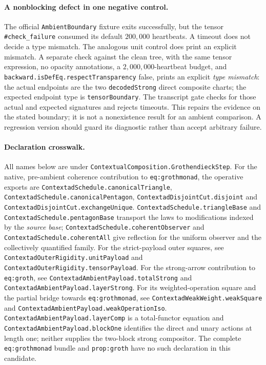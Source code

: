 \documentclass[11pt]{article}
\begin{document}
\paragraph{A nonblocking defect in one negative control.}
The official \texttt{AmbientBoundary} fixture exits successfully, but
the tensor \verb|#check_failure| consumed its default $200{,}000$
heartbeats. A timeout does not decide a type mismatch. The analogous
unit control does print an explicit mismatch. A separate check against
the clean tree, with the same tensor expression, no opacity annotations,
a $2{,}000{,}000$-heartbeat budget, and
\verb|backward.isDefEq.respectTransparency| false, prints an explicit
\emph{type mismatch}: the actual endpoints are the two
\texttt{decodedStrong} direct composite charts; the expected endpoint
type is \texttt{tensorBoundary}. The transcript gate checks for those
actual and expected signatures and rejects timeouts. This repairs the
evidence on the stated boundary; it is not a nonexistence result for
an ambient comparison. A regression version should guard its diagnostic
rather than accept arbitrary failure.
\paragraph{Declaration crosswalk.}
All names below are under
\nolinkurl{ContextualComposition.GrothendieckStep}.
For the native, pre-ambient coherence contribution to
\texttt{eq:grothmonad}, the operative exports are
\nolinkurl{ContextadSchedule.canonicalTriangle},
\nolinkurl{ContextadSchedule.canonicalPentagon},
\nolinkurl{ContextadDisjointCut.disjoint} and
\nolinkurl{ContextadDisjointCut.exchangeUnique}.
\nolinkurl{ContextadSchedule.triangleBase} and
\nolinkurl{ContextadSchedule.pentagonBase} transport the laws to
modifications indexed by the \emph{source base};
\nolinkurl{ContextadSchedule.coherentObserver} and
\nolinkurl{ContextadSchedule.coherentAll} give reflection for the uniform
observer and the collectively quantified family. For the strict-payload
outer squares, see \nolinkurl{ContextadOuterRigidity.unitPayload} and
\nolinkurl{ContextadOuterRigidity.tensorPayload}. For the strong-arrow
contribution to \texttt{eq:groth}, see
\nolinkurl{ContextadAmbientPayload.totalStrong} and
\nolinkurl{ContextadAmbientPayload.layerStrong}. For its weighted-operation
square and the partial bridge towards \texttt{eq:grothmonad}, see
\nolinkurl{ContextadWeakWeight.weakSquare} and
\nolinkurl{ContextadAmbientPayload.weakOperationIso}.
\nolinkurl{ContextadAmbientPayload.layerComp} is a total-functor equation and
\nolinkurl{ContextadAmbientPayload.blockOne} identifies the direct and unary
actions at length one; neither supplies the two-block strong compositor.
The complete \texttt{eq:grothmonad} bundle and
\texttt{prop:groth} have no such declaration in this candidate.
\end{document}
